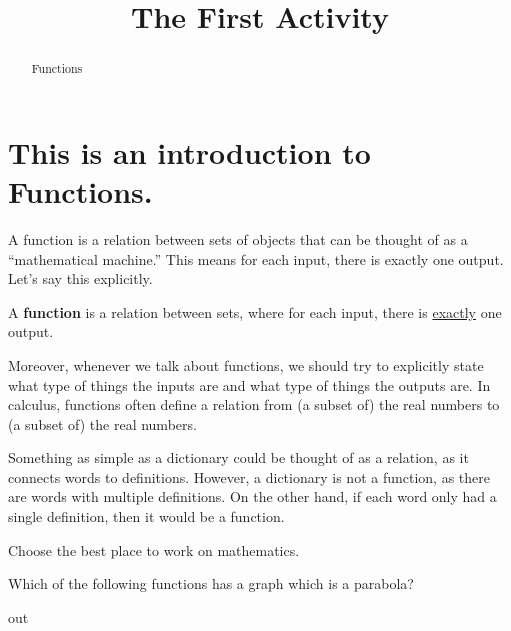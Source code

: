 \documentclass{ximera}
\title{The First Activity}
\theoremstyle{definition}
\begin{document}
  
\begin{abstract}  
Functions  
\end{abstract}  
\maketitle  
\section*{This is an introduction to Functions.}  
A function is a relation between sets of objects that can be thought of as a ``mathematical machine.'' This means for each input, there is exactly one output. Let’s say this explicitly.
\begin{definition}
	A \textbf{function} is a relation between sets, where for each input, there is \underline{exactly} one output.
\end{definition}
Moreover, whenever we talk about functions, we should try to explicitly state what type of things the inputs are and what type of things the outputs are. In calculus, functions often define a relation from (a subset of) the real numbers to (a subset of) the real numbers.
\begin{remark}
Something as simple as a dictionary could be thought
of as a relation, as it connects words to definitions.
However, a dictionary is not a function, as there
are words with multiple definitions. On the other
hand, if each word only had a single definition, then
it would be a function.
\end{remark}
\begin{exercise}  
  Choose the best place to work on mathematics.  
  \begin{multipleChoice}  
  \end{multipleChoice}  
\end{exercise}  
\begin{question}  
	Which of the following functions has a graph which is a parabola?  
	\begin{multipleChoice}  
	\end{multipleChoice}  
\end{question} out
\end{document}
